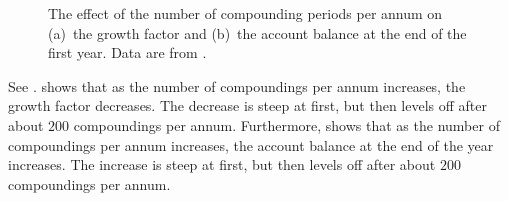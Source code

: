 \documentclass[a4paper,oneside,12pt]{article}
\begin{document}
\begin{problem}
{\begin{solution}
\begin{figure}[!htbp]
\centering
{}
\caption{%
  The effect of the number of compounding periods per annum on
  (a)~the growth factor and (b)~the account balance at the end of the
  first year.  Data are from
  .
}
\label{fig:exponential:e_balance_up_to_12_compounding}
\end{figure}

See .
 shows that as the number
of compoundings per annum increases, the growth factor decreases.  The
decrease is steep at first, but then levels off after about $200$
compoundings per annum.  Furthermore,
 shows that as the number of
compoundings per annum increases, the account balance at the end of
the year increases.  The increase is steep at first, but then levels
off after about $200$ compoundings per annum.


\end{solution}}
\end{problem}
\end{document}
